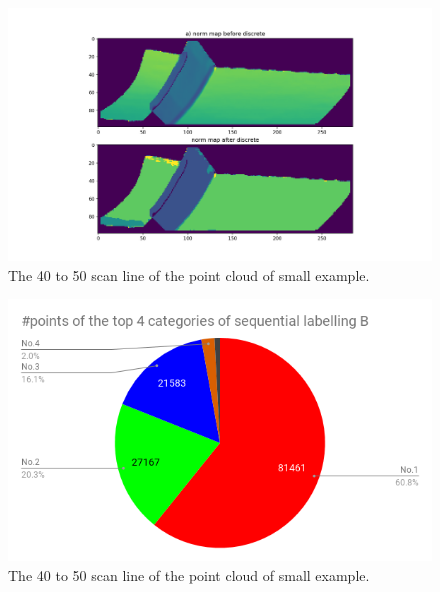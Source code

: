 \documentclass[a4paper,12pt]{article}
\begin{document}
  \begin{figure}[H]
  \begin{center}
      \includegraphics[scale=0.5]{norm_map_big.png}
\end{center}
\caption{The 40 to 50 scan line of the point cloud of small example.}
 \label{fig:40_50_sml_origin}
 \end{figure}
 
 
   \begin{figure}[H]
  \begin{center}
      \includegraphics[scale=0.6]{label_statis_seq_b.png}
\end{center}
\caption{The 40 to 50 scan line of the point cloud of small example.}
 \label{fig:40_50_sml_origin}
 \end{figure}
 
 
 
\end{document}
